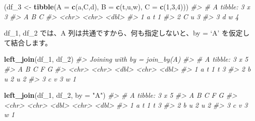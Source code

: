 \documentclass[
  xelatex, ja=standard]{bxjsbook}
\newenvironment{Shaded}{\begin{snugshade}}{\end{snugshade}}
\newcommand{\AttributeTok}[1]{\textcolor[rgb]{0.13,0.29,0.53}{#1}}
\newcommand{\CommentTok}[1]{\textcolor[rgb]{0.56,0.35,0.01}{\textit{#1}}}
\newcommand{\DecValTok}[1]{\textcolor[rgb]{0.00,0.00,0.81}{#1}}
\newcommand{\FunctionTok}[1]{\textcolor[rgb]{0.13,0.29,0.53}{\textbf{#1}}}
\newcommand{\NormalTok}[1]{#1}
\newcommand{\OtherTok}[1]{\textcolor[rgb]{0.56,0.35,0.01}{#1}}
\newcommand{\StringTok}[1]{\textcolor[rgb]{0.31,0.60,0.02}{#1}}
\theoremstyle{definition}
\theoremstyle{definition}
\theoremstyle{definition}
\theoremstyle{definition}
\theoremstyle{remark}
\begin{document}
\begin{Shaded}
\begin{Highlighting}[]
\NormalTok{(df\_3 }\OtherTok{\textless{}{-}} \FunctionTok{tibble}\NormalTok{(}\AttributeTok{A =} \FunctionTok{c}\NormalTok{(}\StringTok{\textquotesingle{}a\textquotesingle{}}\NormalTok{,}\StringTok{\textquotesingle{}C\textquotesingle{}}\NormalTok{,}\StringTok{\textquotesingle{}d\textquotesingle{}}\NormalTok{), }\AttributeTok{B =} \FunctionTok{c}\NormalTok{(}\StringTok{\textquotesingle{}t\textquotesingle{}}\NormalTok{,}\StringTok{\textquotesingle{}u\textquotesingle{}}\NormalTok{,}\StringTok{\textquotesingle{}w\textquotesingle{}}\NormalTok{), }\AttributeTok{C =} \FunctionTok{c}\NormalTok{(}\DecValTok{1}\NormalTok{,}\DecValTok{3}\NormalTok{,}\DecValTok{4}\NormalTok{)))}
\CommentTok{\#\textgreater{} \# A tibble: 3 x 3}
\CommentTok{\#\textgreater{}   A     B         C}
\CommentTok{\#\textgreater{}   \textless{}chr\textgreater{} \textless{}chr\textgreater{} \textless{}dbl\textgreater{}}
\CommentTok{\#\textgreater{} 1 a     t         1}
\CommentTok{\#\textgreater{} 2 C     u         3}
\CommentTok{\#\textgreater{} 3 d     w         4}
\end{Highlighting}
\end{Shaded}

df\_1, df\_2 では、A 列は共通ですから、何も指定しないと、by = `A' を仮定して結合します。

\begin{Shaded}
\begin{Highlighting}[]
\FunctionTok{left\_join}\NormalTok{(df\_1, df\_2)}
\CommentTok{\#\textgreater{} Joining with \textasciigrave{}by = join\_by(A)\textasciigrave{}}
\CommentTok{\#\textgreater{} \# A tibble: 3 x 5}
\CommentTok{\#\textgreater{}   A     B         C F         G}
\CommentTok{\#\textgreater{}   \textless{}chr\textgreater{} \textless{}chr\textgreater{} \textless{}dbl\textgreater{} \textless{}chr\textgreater{} \textless{}dbl\textgreater{}}
\CommentTok{\#\textgreater{} 1 a     t         1 t         3}
\CommentTok{\#\textgreater{} 2 b     u         2 u         2}
\CommentTok{\#\textgreater{} 3 c     v         3 w         1}
\end{Highlighting}
\end{Shaded}

\begin{Shaded}
\begin{Highlighting}[]
\FunctionTok{left\_join}\NormalTok{(df\_1, df\_2, }\AttributeTok{by =} \StringTok{"A"}\NormalTok{)}
\CommentTok{\#\textgreater{} \# A tibble: 3 x 5}
\CommentTok{\#\textgreater{}   A     B         C F         G}
\CommentTok{\#\textgreater{}   \textless{}chr\textgreater{} \textless{}chr\textgreater{} \textless{}dbl\textgreater{} \textless{}chr\textgreater{} \textless{}dbl\textgreater{}}
\CommentTok{\#\textgreater{} 1 a     t         1 t         3}
\CommentTok{\#\textgreater{} 2 b     u         2 u         2}
\CommentTok{\#\textgreater{} 3 c     v         3 w         1}
\end{Highlighting}
\end{Shaded}
\end{document}
